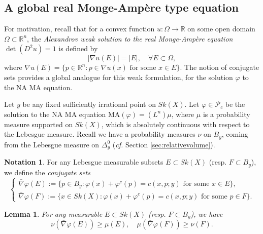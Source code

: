 \documentclass[a4paper]{article}
\newtheorem{lem}[thm]{Lemma}
\theoremstyle{definition}
\newtheorem*{Notation}{Notation}
\newcommand{\cf}{\emph{cf.} }
\newcommand{\R}{\mathbb{R}}
\begin{document}
		
		

	
	
	
	
	
	
	
	\subsection{A global real Monge-Amp\`ere type equation}
	
	
	
	
	
	

For motivation, recall that for a convex function $u:\Omega\to \R$ on some open domain $\Omega\subset \R^n$, 
the \emph{Alexandrov weak solution to the real Monge-Amp\`ere equation} $\det(D^2 u)=1$ is defined by 
\[
|\nabla u(E) |= |E|,\quad  \forall E\subset \Omega,
\]
where $\nabla u(E)= \{     p\in \R^n:  p\in \nabla u(x) \text{ for some }  x\in E    \}.
$
The notion of conjugate sets provides a global analogue for this weak formulation, for the solution $\varphi$ to the NA MA equation. 






	Let $y$ be any fixed sufficiently irrational point on $Sk(X)$. 
Let $\varphi\in \mathcal{P}_c$ be the solution to the NA MA equation $\text{MA}(\varphi)=(L^n)\mu$, where $\mu$ is a probability measure supported on $Sk(X)$, which is absolutely continuous with respect to the Lebesgue measure. Recall we have  a probability measures $\nu$ on  $B_y$, coming from the Lebesgue measure on $\Delta_y^0$ (\cf Section \ref{sec:relativevolume}).



\begin{Notation}
For any Lebesgue measurable subsets $E\subset Sk(X)$ (resp. $F\subset B_y$), we define the \emph{conjugate sets}
\[
\begin{cases}
	\bar{\nabla}\varphi (E):= \{    p\in B_y:  \varphi(x)+ \varphi^c(p)=c(x,p;y) \text{ for some }  x\in E            \},
	\\
		\bar{\nabla}\varphi (F):= \{    x\in Sk(X):  \varphi(x)+ \varphi^c(p)=c(x,p;y) \text{ for some }  p\in F           \}.
\end{cases}
\]

\end{Notation}

	
	
	
	
	
\begin{lem}\label{lem:globalrealMA}
For any measurable $E\subset Sk(X)$ (resp. $F\subset B_y$), we have
\[
\nu( 	\bar{\nabla}\varphi (E  ) )\geq  \mu(E), \quad \mu(	\bar{\nabla}\varphi (F))\geq \nu(F).
\]
	
	
	
\end{lem}
	
\end{document}
